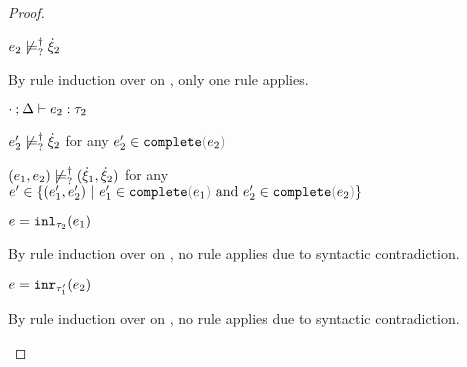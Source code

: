 \begin{proof}
\begin{byCases}
\begin{byCases}
\begin{byCases}
        \item[\cnotsatisfyormay{e_2}{\hxi_2}]
        \begin{pfsteps*}
        \item $e_2 \not\models_{?}^{\dag} \dot{\xi}_2$  
        \end{pfsteps*}
        By rule induction over  on , only one rule applies.
        \begin{byCases}
          \item[\text{(\ref{rule:TPair})}]
          \begin{pfsteps*}
          \item $\cdot \mathbin{;} \Delta \vdash e_2 : \tau_2$  
          \item $e_2' \not\models_{?}^{\dag} \dot{\xi}_2$ for any $e_2' \in \expcomplete{e_2}$  
          \item $(e_1 , e_2) \not\models_{?}^{\dag} (\dot{\xi}_1 , \dot{\xi}_2)$ for any $e' \in \{\hpair{e_1'}{e_2'} ~\vert~ e_1' \in \expcomplete{e_1} \textand e_2' \in \expcomplete{e_2}\}$ 
          \end{pfsteps*} 
        \end{byCases}
      \end{byCases}
      \item[\text{(\ref{rule:IInl})}] 
      \begin{pfsteps*}
      \item $e=\mathtt{inl}_{\tau_2}({e_1})$ 
      \end{pfsteps*} 
      By rule induction over  on , no rule applies due to syntactic contradiction.
      \item[\text{(\ref{rule:IInr})}] 
      \begin{pfsteps*}
      \item $e=\mathtt{inr}_{\tau_1'}({e_2})$ 
      \end{pfsteps*} 
      By rule induction over  on , no rule applies due to syntactic contradiction.
    \end{byCases}
    \item[\text{(\ref{rule:CTOr})}]
    \begin{pfsteps*}

\end{pfsteps*}
\end{byCases}
\end{proof}
